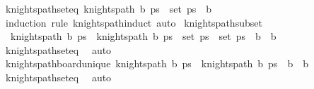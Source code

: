 \begin{isabellebody}
\endisatagproof
{\isafoldproof}%
%
\isadelimproof
\isanewline
%
\endisadelimproof
\isanewline
{}\isamarkupfalse%
\ knights{\isacharunderscore}{\kern0pt}path{\isacharunderscore}{\kern0pt}set{\isacharunderscore}{\kern0pt}eq{\isacharcolon}{\kern0pt}\ {\isachardoublequoteopen}knights{\isacharunderscore}{\kern0pt}path\ b\ ps\ {\isasymLongrightarrow}\ set\ ps\ {\isacharequal}{\kern0pt}\ b{\isachardoublequoteclose}\isanewline
%
\isadelimproof
\ \ %
\endisadelimproof
%
\isatagproof
{}\isamarkupfalse%
\ {\isacharparenleft}{\kern0pt}induction\ rule{\isacharcolon}{\kern0pt}\ knights{\isacharunderscore}{\kern0pt}path{\isachardot}{\kern0pt}induct{\isacharparenright}{\kern0pt}\ auto%
\endisatagproof
{\isafoldproof}%
%
\isadelimproof
\isanewline
%
\endisadelimproof
\isanewline
{}\isamarkupfalse%
\ knights{\isacharunderscore}{\kern0pt}path{\isacharunderscore}{\kern0pt}subset{\isacharcolon}{\kern0pt}\ \isanewline
\ \ {\isachardoublequoteopen}knights{\isacharunderscore}{\kern0pt}path\ b\ ps\ {\isasymLongrightarrow}\ knights{\isacharunderscore}{\kern0pt}path\ b\ ps\ {\isasymLongrightarrow}\ set\ ps\ {\isasymsubseteq}\ set\ ps\ {\isasymlongleftrightarrow}\ b\ {\isasymsubseteq}\ b\isanewline
%
\isadelimproof
\ \ %
\endisadelimproof
%
\isatagproof
{}\isamarkupfalse%
\ knights{\isacharunderscore}{\kern0pt}path{\isacharunderscore}{\kern0pt}set{\isacharunderscore}{\kern0pt}eq\ \isamarkupfalse%
\ auto%
\endisatagproof
{\isafoldproof}%
%
\isadelimproof
\isanewline
%
\endisadelimproof
\isanewline
{}\isamarkupfalse%
\ knights{\isacharunderscore}{\kern0pt}path{\isacharunderscore}{\kern0pt}board{\isacharunderscore}{\kern0pt}unique{\isacharcolon}{\kern0pt}\ {\isachardoublequoteopen}knights{\isacharunderscore}{\kern0pt}path\ b\ ps\ {\isasymLongrightarrow}\ knights{\isacharunderscore}{\kern0pt}path\ b\ ps\ {\isasymLongrightarrow}\ b\ {\isacharequal}{\kern0pt}\ b\isanewline
%
\isadelimproof
\ \ %
\endisadelimproof
%
\isatagproof
{}\isamarkupfalse%
\ knights{\isacharunderscore}{\kern0pt}path{\isacharunderscore}{\kern0pt}set{\isacharunderscore}{\kern0pt}eq\ \isamarkupfalse%
\ auto%
\endisatagproof
{\isafoldproof}%

\end{isabellebody}
